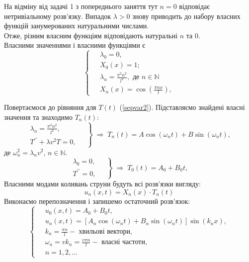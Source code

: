 На відміну від задачі 1 з попереднього заняття тут $n = 0$ відповідає нетривіальному розв'язку. Випадок $\lambda > 0$ знову приводить до набору власних функцій занумерованих натуральними числами.\\
Отже, різним власним функціям відповідають натуральні $n$ та $0$.\\
    Власними значеннями і власними функціями є
    \begin{equation} \label{ShLsol2}
        \left\{ \begin{aligned}
            &\lambda_0 = 0,\\
            &X_0(x) = 1;\\
            \;&\lambda_n = \frac{\pi^2 n^2}{l^2}, \text{ де } n \in \mathbb{N}\\ 
            &X_n(x) = \cos\left(\frac{\pi n x}{l}\right),
        \end{aligned} \right.
    \end{equation}

Повертаємося до рівняння для $T(t)$ (\ref{sepvar2}). Підставляємо знайдені власні значення та знаходимо $T_n(t)$:
\begin{equation*}
    \left. \begin{aligned}
        \lambda_n = \frac{\pi^2 n^2}{l^2},&\;\\ 
        T^{\prime\prime} + \lambda v^2T = 0,&
    \end{aligned} \right\}
    \;\Rightarrow\;
    T_n(t) = A\cos(\omega_n t) + B\sin(\omega_n t),
\end{equation*}
де $\omega_n^2 = \lambda_n v^2, \, n \in \mathbb{N}.$\\
\begin{equation*}
    \left. \begin{aligned}
        \lambda_0 = 0,&\;\\ 
        T^{\prime\prime} = 0,&
    \end{aligned} \right\}
    \;\Rightarrow\;
    T_0(t) = A_0 + B_0 t,
\end{equation*}
Власними модами коливань струни будуть всі розв'язки вигляду:
\begin{equation*}
    u_n(x,t) = X_n(x) \cdot T_n(t)
\end{equation*}
Виконаємо перепозначення і запишемо остаточний розв'язок:
\begin{equation}
    \left\{ \begin{aligned} \label{sol2}
        \;&u_0(x,t) = A_0 + B_0 t, \\
        &u_n(x,t) = \left[A_n\cos(\omega_n t) + B_n\sin(\omega_n t)\right] \sin(k_n x), \\
        &k_n = \frac{\pi n}{l} - \text{ хвильові вектори}, \\
        &\omega_n = vk_n = \frac{v \pi n}{l} - \text{ власні частоти}, \\
        &n = 1, 2,\ldots
    \end{aligned}\right.
\end{equation}

